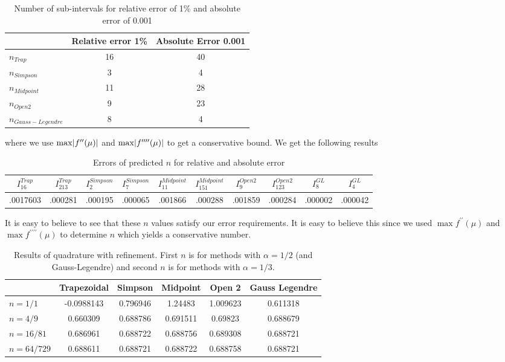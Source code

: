 \documentclass[12pt]{article}
\DeclarePairedDelimiter \abs{\lvert}{\rvert}%
\theoremstyle{remark}
\begin{document}
\begin{table}[H]
	\centering
	\begin{tabular}{||l|c|c||}
		\cline{2-3}
		\multicolumn{1}{c|}{} & Relative error 1\% & Absolute Error 0.001 \\ \hline \hline
		$n_{Trap}$ & 16	 & 40 \\ \hline
		$n_{Simpson}$ & 3 & 4 \\ \hline
		$n_{Midpoint}$ & 11 & 28 \\ \hline
		$n_{Open2}$ & 9 & 23 \\ \hline
		$n_{Gauss-Legendre}$ & 8 & 4 \\ \hline
	\end{tabular}
	\caption{Number of sub-intervals for relative error of 1\% and absolute error of 0.001}
\end{table}
where we use $\max \abs{f^{\prime\prime}(\mu)}$ and $\max \abs{f^{\prime\prime\prime\prime}(\mu)}$ to get a conservative bound. We get the following results 
\begin{table}[H]
	\centering
	\begin{tabular}{||c|c|c|c|c|c|c|c|c|c||}
	\hline
	$I_{16}^{Trap}$ & $I_{213}^{Trap}$ & $I_{2}^{Simpson}$ & $I_{7}^{Simpson}$ & $I_{11}^{Midpoint}$ & $I_{151}^{Midpoint}$ & $I_{9}^{Open2}$ & $I_{123}^{Open2}$ & $I_8^{GL}$ & $I_4^{GL}$ \\ \hline \hline
		.0017603 & .000281 & .000195 & .000065 & .001866 & .000288 & .001859 & .000284 & .000002 & .000042 \\ \hline
	\end{tabular} 
	\caption{Errors of predicted $n$ for relative and absolute error}
\end{table}
It is easy to believe to see that these $n$ values satisfy our error requirements. It is easy to believe this since we used $\max f^{\prime\prime}(\mu)$ and $\max f^{\prime\prime\prime\prime}(\mu)$ to determine $n$ which yields a conservative number.
\begin{table}[H]
	\centering
	\begin{tabular}{||l|c|c|c|c|c||}
		\cline{2-6}
		\multicolumn{1}{c|}{} & Trapezoidal & Simpson & Midpoint & Open 2 & Gauss Legendre \\ \hline \hline
		$n=1/1$ & -0.0988143 & 0.796946 & 1.24483 & 1.009623 & 0.611318 \\ \hline
		$n=4/9$ & 0.660309 & 0.688786 & 0.691511 & 0.69823 & 0.688679 \\ \hline
		$n=16/81$ & 0.686961 & 0.688722 & 0.688756 & 0.689308 & 0.688721 \\ \hline
		$n=64/729$ & 0.688611 & 0.688721 & 0.688722 & 0.688758 & 0.688721 \\ \hline
	\end{tabular}
	\caption{Results of quadrature with refinement. First $n$ is for methods with $\alpha = 1/2$ (and Gauss-Legendre) and second $n$ is for methods with $\alpha = 1/3$.}
\end{table}
\end{document}
